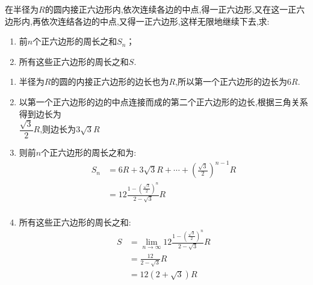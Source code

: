 \begin{questions}
\begin{enumerate}[label=(\arabic*)]
\begin{solution}
		      \end{solution}
	\end{enumerate}
	\question 在半径为$R$的圆内接正六边形内,依次连续各边的中点,得一正六边形,又在这一正六边形内,再依次连结各边的中点,又得一正六边形,这样无限地继续下去,求:
	\begin{enumerate}[label=(\arabic*)]
		\item 前$n$个正六边形的周长之和$S_n$；
		\item 所有这些正六边形的周长之和$S$.
	\end{enumerate}
	\begin{solution}
		\begin{enumerate}[label=\zhnum{*}、]
			\item 半径为$R$的圆的内接正六边形的边长也为$R$,所以第一个正六边形的边长为$6R$.
			\item
			      以第一个正六边形的边的中点连接而成的第二个正六边形的边长,根据三角关系得到边长为\\$\dfrac{\sqrt{3}}{2}R$,则边长为$3\sqrt{3}R$
			\item 则前$n$个正六边形的周长之和为:
			      \begin{align*}
				      S_n & = 6R + 3\sqrt{3}R + \cdots +  (\frac{\sqrt{3}}{2})^{n-1}R \\
				          & = 12\frac{1-(\frac{\sqrt{3}}{2})^n}{2-\sqrt{3}}R          \\
			      \end{align*}
			\item 所有这些正六边形的周长之和:
			      \begin{align*}
				      S & = \lim_{n\to\infty}12\frac{1-(\frac{\sqrt{3}}{2})^n}{2-\sqrt{3}}R \\
				        & = \frac{12}{2-\sqrt{3}}R                                          \\
				        & = 12(2+\sqrt{3})R
			      \end{align*}
		\end{enumerate}
	\end{solution}


\end{questions}
